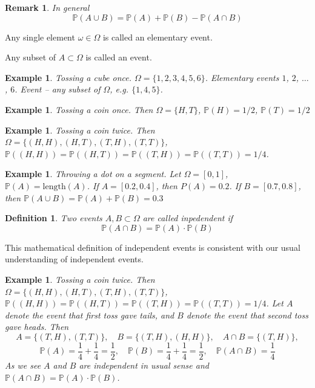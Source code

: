 \documentclass[12pt]{article}
\newtheorem{remark}[theorem]{Remark}
\newtheorem{definition}[theorem]{Definition}
\newtheorem{example}[theorem]{Example}
\begin{document}
\begin{remark} In general
$$
\mathbb{P}(A\cup B)=\mathbb{P}(A)+\mathbb{P}(B)-\mathbb{P}(A\cap B)
$$
\end{remark}


Any single element $\omega\in\Omega$ is called an elementary event. 

Any subset of $A\subset\Omega$ is called an event.

\begin{example} Tossing a cube once. $\Omega=\{1,2,3,4,5,6\}$. Elementary events $1$, $2$, $\ldots$, $6$. Event -- any subset of $\Omega$, e.g. $\{1,4,5\}$.
\end{example}

\begin{example} Tossing a coin once. Then  $\Omega=\{H, T\}$, $\mathbb{P}(H)=1/2$, $\mathbb{P}(T)=1/2$
\end{example}

\begin{example} Tossing a coin twice. Then  $\Omega=\{(H,H), (H, T), (T, H), (T,T)\}$, $\mathbb{P}((H,H))=\mathbb{P}((H,T))=\mathbb{P}((T,H))=\mathbb{P}((T,T))=1/4$.
\end{example}

\begin{example} Throwing a dot on a segment. Let $\Omega=[0,1]$, $\mathbb{P}(A)=\mbox{length}(A)$. If $A=[0.2, 0.4]$, then $P(A)=0.2$. If $B=[0.7,0.8]$, then $\mathbb{P}(A\cup B)=\mathbb{P}(A)+\mathbb{P}(B)=0.3$
\end{example}

\begin{definition} Two events $A,B\subset \Omega$ are called inpedendent if
$$
\mathbb{P}(A\cap B)=\mathbb{P}(A)\cdot\mathbb{P}(B)
$$
\end{definition}

This mathematical definition of independent events is consistent with our usual understanding of independent events.

\begin{example} Tossing a coin twice. Then  $\Omega=\{(H,H), (H, T), (T, H), (T,T)\}$, $\mathbb{P}((H,H))=\mathbb{P}((H,T))=\mathbb{P}((T,H))=\mathbb{P}((T,T))=1/4$. Let $A$ denote the event that first toss gave tails, and $B$ denote the event that second toss gave heads. Then
$$
A=\{(T,H),(T,T)\},\quad B=\{(T,H),(H,H)\},\quad A\cap B=\{(T,H)\},
$$
$$
\mathbb{P}(A)=\frac{1}{4}+\frac{1}{4}=\frac{1}{2},\quad 
\mathbb{P}(B)=\frac{1}{4}+\frac{1}{4}=\frac{1}{2},\quad
\mathbb{P}(A\cap B)=\frac{1}{4}
$$
As we see $A$ and $B$ are independent in usual sense and $\mathbb{P}(A\cap B)=\mathbb{P}(A)\cdot\mathbb{P}(B)$.
\end{example}
\end{document}
